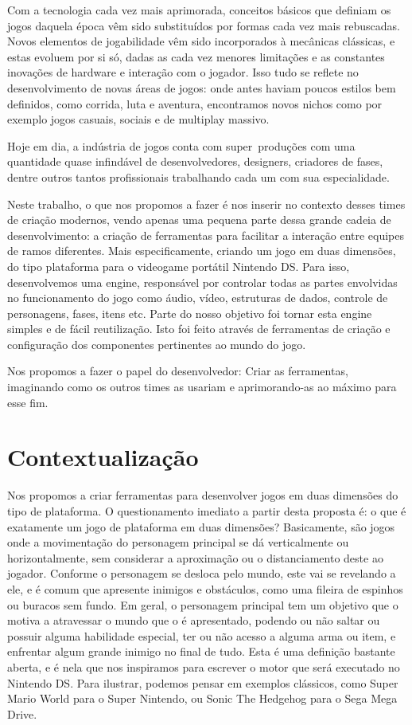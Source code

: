 \documentclass[brazil]{abnt}
\begin{document}
Com a tecnologia cada vez mais aprimorada, conceitos básicos que definiam os jogos daquela época vêm sido substituídos por formas cada vez mais rebuscadas. Novos elementos de jogabilidade vêm sido incorporados à mecânicas clássicas, e estas evoluem por si só, dadas as cada vez menores limitações e as constantes inovações de hardware e interação com o jogador. Isso tudo se reflete no desenvolvimento de novas áreas de jogos: onde antes haviam poucos estilos bem definidos, como corrida, luta e aventura, encontramos novos nichos como por exemplo jogos casuais, sociais e de multiplay massivo.

Hoje em dia, a indústria de jogos conta com super~produções com uma quantidade quase infindável de desenvolvedores, designers, criadores de fases, dentre outros tantos profissionais trabalhando cada um com sua especialidade.

Neste trabalho, o que nos propomos a fazer é nos inserir no contexto desses times de criação modernos, vendo apenas uma pequena parte dessa grande cadeia de desenvolvimento: a criação de ferramentas para facilitar a interação entre equipes de ramos diferentes. Mais especificamente, criando um jogo em duas dimensões, do tipo plataforma para o videogame portátil Nintendo DS. Para isso, desenvolvemos uma engine, responsável por controlar todas as partes envolvidas no funcionamento do jogo como áudio, vídeo, estruturas de dados, controle de personagens, fases, itens etc. Parte do nosso objetivo foi tornar esta engine  simples e de fácil reutilização. Isto foi feito através de ferramentas de criação e configuração dos componentes pertinentes ao mundo do jogo.

Nos propomos a fazer o papel do desenvolvedor: Criar as ferramentas, imaginando como os outros times as usariam e aprimorando-as ao máximo para esse fim.

\section{Contextualização}

Nos propomos a criar ferramentas para desenvolver jogos em duas dimensões do tipo de plataforma. O questionamento imediato a partir desta proposta é: o que é exatamente um jogo de plataforma em duas dimensões? Basicamente, são jogos onde a movimentação do personagem principal se dá verticalmente ou horizontalmente, sem considerar a aproximação ou o distanciamento deste ao jogador. Conforme o personagem se desloca pelo mundo, este vai se revelando a ele, e é comum que apresente inimigos e obstáculos, como uma fileira de espinhos ou buracos sem fundo. Em geral, o personagem principal tem um objetivo que o motiva a atravessar o mundo que o é apresentado, podendo ou não saltar ou possuir alguma habilidade especial, ter ou não acesso a alguma arma ou item, e enfrentar algum grande inimigo no final de tudo. Esta é uma definição bastante aberta, e é nela que nos inspiramos para escrever o motor que será executado no Nintendo DS. Para ilustrar, podemos pensar em exemplos clássicos, como Super Mario World para o Super Nintendo, ou Sonic The Hedgehog para o Sega Mega Drive.
\end{document}
